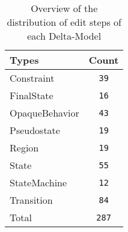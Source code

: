 \begin{table} 
 \center 
 \small 
\begin{tabular}{|l|c|}
\hline
Types & Count\\ 
  \hline 
Constraint & \texttt{39}\\ 
  \hline 
FinalState & \texttt{16}\\ 
  \hline 
OpaqueBehavior & \texttt{43}\\ 
  \hline 
Pseudostate & \texttt{19}\\ 
  \hline 
Region & \texttt{19}\\ 
  \hline 
State & \texttt{55}\\ 
  \hline 
StateMachine & \texttt{12}\\ 
  \hline 
Transition & \texttt{84}\\ 
  \hline 
Total & \texttt{287}\\ 
  \hline 
\end{tabular}
\caption[Overview: Delta-Models]{Overview of the distribution of edit steps of each Delta-Model}
\end{table}

